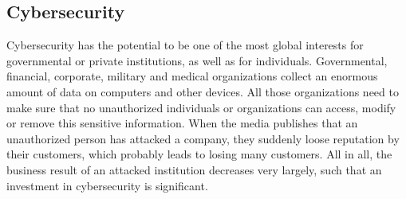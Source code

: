 \subsection{Cybersecurity}
\label{subsec:02_cybersecurity}

Cybersecurity has the potential to be one of the most global interests for governmental or private institutions, as well as for individuals. Governmental, financial, corporate, military and medical organizations collect an enormous amount of data on computers and other devices. All those organizations need to make sure that no unauthorized individuals or organizations can access, modify or remove this sensitive information. When the media publishes that an unauthorized person has attacked a company, they suddenly loose reputation by their customers, which probably leads to losing many customers. All in all, the business result of an attacked institution decreases very largely, such that an investment in cybersecurity is significant.

